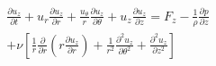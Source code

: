 \begin{align}
\frac{\partial u_z}{\partial t} + u_r \frac{\partial u_z}{\partial r} + \frac{u_\theta}{r} \frac{\partial u_z}{\partial \theta} + u_z \frac{\partial u_z}{\partial z} = F_z-\frac{1}{\rho}\frac{\partial p}{\partial z} \nonumber \\
+ \nu \left[ \frac{1}{r} \frac{\partial}{\partial r}\left( r \frac{\partial u_z}{\partial r} \right) + \frac{1}{r^2}\frac{\partial^2 u_z}{\partial \theta^2} + \frac{\partial^2 u_z}{\partial z^2} \right] 
\end{align}


